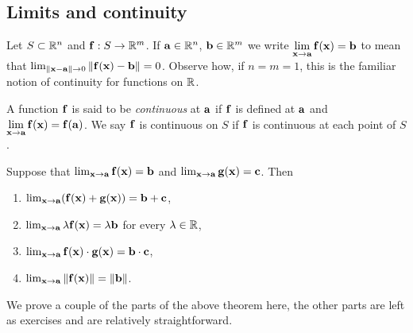 \subsection*{Limits and continuity}

Let \(S\subset \bR^n\) and \(\ff : S \to \bR^m\).
If \(\aa\in \bR^n\), \(\bb\in \bR^m\) we write
    {\(  \displaystyle\lim_{\xx \to \aa}\ff(\xx) = \bb \)}
to mean that
\(\lim_{\norm{\xx-\aa}\to 0}\norm{\ff(\xx)-\bb}=0\).
Observe how, if \(n=m=1\), this is the familiar notion of continuity for functions on \(\bR\).

\begin{definition}[continuous]
    A function \(\ff\) is said to be \emph{continuous} at \(\aa\) if \(\ff\) is defined at \(\aa\) and
    \(  \displaystyle\lim_{\xx \to \aa}\ff(\xx) = \ff(\aa)\).
    We say \(\ff\) is continuous on \(S\) if \(\ff\) is continuous at each point of \(S\).
\end{definition}

\begin{theorem}
    Suppose that \(  \lim_{\xx \to \aa}\ff(\xx) = \bb\) and \(  \lim_{\xx \to \aa}\gg(\xx) = \cc\).
    Then
    \begin{enumerate}
        \item \(  \lim_{\xx \to \aa}(\ff(\xx)+\gg(\xx)) = \bb+\cc\),
        \item \(  \lim_{\xx \to \aa} \lambda \ff(\xx) = \lambda \bb\) for every \(\lambda \in \bR\),
        \item \(  \lim_{\xx \to \aa}\ff(\xx)\cdot \gg(\xx) = \bb\cdot \cc\),
        \item \(  \lim_{\xx \to \aa} \norm{\ff(\xx)} = \norm{\bb}\).
    \end{enumerate}
\end{theorem}

We prove a couple of the parts of the above theorem here, the other parts are left as exercises and are relatively straightforward.

